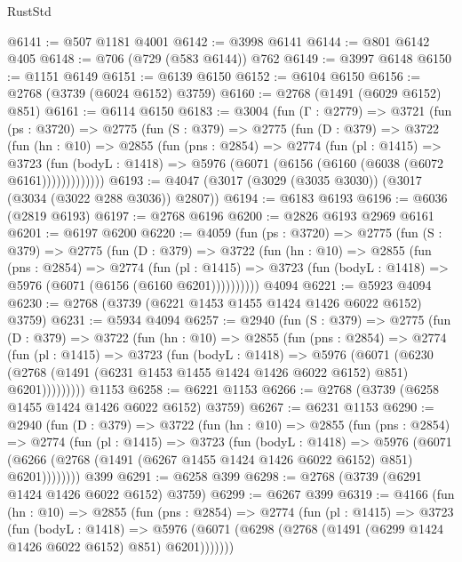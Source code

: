 \begin{lexlean}{RustStd}
\begin{coremodule}
@6141 := @507 @1181 @4001
@6142 := @3998 @6141
@6144 := @801 @6142 @405
@6148 := @706 (@729 (@583 @6144)) @762
@6149 := @3997 @6148
@6150 := @1151 @6149
@6151 := @6139 @6150
@6152 := @6104 @6150
@6156 := @2768 (@3739 (@6024 @6152) @3759)
@6160 := @2768 (@1491 (@6029 @6152) @851)
@6161 := @6114 @6150
@6183 := @3004
    (fun (Γ : @2779) =>
    @3721
      (fun (ps : @3720) =>
      @2775
        (fun (S : @379) =>
        @2775
          (fun (D : @379) =>
          @3722
            (fun (hn : @10) =>
            @2855
              (fun (pns : @2854) =>
              @2774
                (fun (pl : @1415) =>
                @3723
                  (fun (bodyL : @1418) =>
                  @5976 (@6071 (@6156 (@6160 (@6038 (@6072 @6161)))))))))))))
@6193 := @4047 (@3017 (@3029 (@3035 @3030)) (@3017 (@3034 (@3022 @288 @3036)) @2807))
@6194 := @6183 @6193
@6196 := @6036 (@2819 @6193)
@6197 := @2768 @6196
@6200 := @2826 @6193 @2969 @6161
@6201 := @6197 @6200
@6220 := @4059
    (fun (ps : @3720) =>
    @2775
      (fun (S : @379) =>
      @2775
        (fun (D : @379) =>
        @3722
          (fun (hn : @10) =>
          @2855
            (fun (pns : @2854) =>
            @2774
              (fun (pl : @1415) =>
              @3723 (fun (bodyL : @1418) => @5976 (@6071 (@6156 (@6160 @6201))))))))))
    @4094
@6221 := @5923 @4094
@6230 := @2768 (@3739 (@6221 @1453 @1455 @1424 @1426 @6022 @6152) @3759)
@6231 := @5934 @4094
@6257 := @2940
    (fun (S : @379) =>
    @2775
      (fun (D : @379) =>
      @3722
        (fun (hn : @10) =>
        @2855
          (fun (pns : @2854) =>
          @2774
            (fun (pl : @1415) =>
            @3723
              (fun (bodyL : @1418) =>
              @5976
                (@6071
                  (@6230
                    (@2768 (@1491 (@6231 @1453 @1455 @1424 @1426 @6022 @6152) @851) @6201)))))))))
    @1153
@6258 := @6221 @1153
@6266 := @2768 (@3739 (@6258 @1455 @1424 @1426 @6022 @6152) @3759)
@6267 := @6231 @1153
@6290 := @2940
    (fun (D : @379) =>
    @3722
      (fun (hn : @10) =>
      @2855
        (fun (pns : @2854) =>
        @2774
          (fun (pl : @1415) =>
          @3723
            (fun (bodyL : @1418) =>
            @5976
              (@6071 (@6266 (@2768 (@1491 (@6267 @1455 @1424 @1426 @6022 @6152) @851) @6201))))))))
    @399
@6291 := @6258 @399
@6298 := @2768 (@3739 (@6291 @1424 @1426 @6022 @6152) @3759)
@6299 := @6267 @399
@6319 := @4166
    (fun (hn : @10) =>
    @2855
      (fun (pns : @2854) =>
      @2774
        (fun (pl : @1415) =>
        @3723
          (fun (bodyL : @1418) =>
          @5976 (@6071 (@6298 (@2768 (@1491 (@6299 @1424 @1426 @6022 @6152) @851) @6201)))))))

\end{coremodule}
\end{lexlean}
